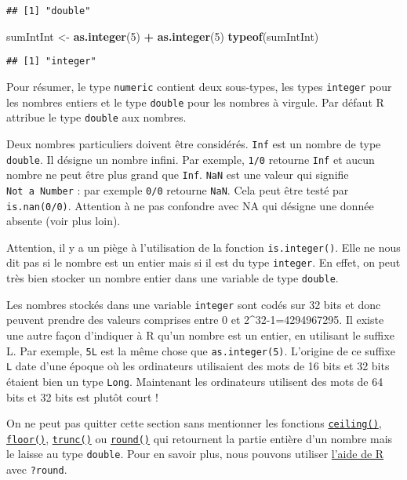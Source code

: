 \documentclass[]{book}
\newenvironment{Shaded}{\begin{snugshade}}{\end{snugshade}}
\newcommand{\KeywordTok}[1]{\textcolor[rgb]{0.13,0.29,0.53}{\textbf{#1}}}
\newcommand{\DecValTok}[1]{\textcolor[rgb]{0.00,0.00,0.81}{#1}}
\newcommand{\StringTok}[1]{\textcolor[rgb]{0.31,0.60,0.02}{#1}}
\newcommand{\OperatorTok}[1]{\textcolor[rgb]{0.81,0.36,0.00}{\textbf{#1}}}
\newcommand{\NormalTok}[1]{#1}
\theoremstyle{definition}
\theoremstyle{definition}
\theoremstyle{definition}
\theoremstyle{remark}
\begin{document}
\begin{verbatim}
## [1] "double"
\end{verbatim}

\begin{Shaded}
\begin{Highlighting}[]
\NormalTok{sumIntInt <-}\StringTok{ }\KeywordTok{as.integer}\NormalTok{(}\DecValTok{5}\NormalTok{) }\OperatorTok{+}\StringTok{ }\KeywordTok{as.integer}\NormalTok{(}\DecValTok{5}\NormalTok{)}
\KeywordTok{typeof}\NormalTok{(sumIntInt)}
\end{Highlighting}
\end{Shaded}

\begin{verbatim}
## [1] "integer"
\end{verbatim}

Pour résumer, le type \texttt{numeric} contient deux sous-types, les
types \texttt{integer} pour les nombres entiers et le type
\texttt{double} pour les nombres à virgule. Par défaut R attribue le
type \texttt{double} aux nombres.

Deux nombres particuliers doivent être considérés. \texttt{Inf} est un
nombre de type \texttt{double}. Il désigne un nombre infini. Par
exemple, \texttt{1/0} retourne \texttt{Inf} et aucun nombre ne peut être
plus grand que \texttt{Inf}. \texttt{NaN} est une valeur qui signifie
\texttt{Not\ a\ Number} : par exemple \texttt{0/0} retourne
\texttt{NaN}. Cela peut être testé par \texttt{is.nan(0/0)}. Attention à
ne pas confondre avec NA qui désigne une donnée absente (voir plus
loin).

Attention, il y a un piège à l'utilisation de la fonction
\texttt{is.integer()}. Elle ne nous dit pas si le nombre est un entier
mais si il est du type \texttt{integer}. En effet, on peut très bien
stocker un nombre entier dans une variable de type \texttt{double}.

Les nombres stockés dans une variable \texttt{integer} sont codés sur 32
bits et donc peuvent prendre des valeurs comprises entre 0 et
2\^{}32-1=4294967295. Il existe une autre façon d'indiquer à R qu'un
nombre est un entier, en utilisant le suffixe L. Par exemple,
\texttt{5L} est la même chose que \texttt{as.integer(5)}. L'origine de
ce suffixe \texttt{L} date d'une époque où les ordinateurs utilisaient
des mots de 16 bits et 32 bits étaient bien un type \texttt{Long}.
Maintenant les ordinateurs utilisent des mots de 64 bits et 32 bits est
plutôt court !

On ne peut pas quitter cette section sans mentionner les fonctions
\protect\hyperlink{l015round}{\texttt{ceiling()}},
\protect\hyperlink{l015round}{\texttt{floor()}},
\protect\hyperlink{l015round}{\texttt{trunc()}} ou
\protect\hyperlink{l015round}{\texttt{round()}} qui retournent la partie
entière d'un nombre mais le laisse au type \texttt{double}. Pour en
savoir plus, nous pouvons utiliser \protect\hyperlink{l015help}{l'aide
de R} avec \texttt{?round}.
\end{document}
